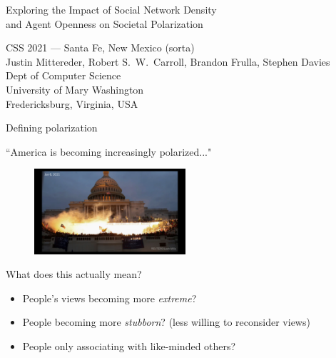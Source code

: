 \documentclass[12pt]{beamer}
\author{Mittereder, \textit{et. al.}}
\begin{document}
\begin{frame}[c]{} %

\begin{center}
\Large
Exploring the Impact of Social Network Density\\and Agent Openness on Societal Polarization

\footnotesize
\vspace{.3in}
CSS 2021 --- Santa Fe, New Mexico (sorta)\\
\vspace{.1in}
Justin Mittereder, Robert S.~W.~Carroll, Brandon Frulla, Stephen Davies\\
\scriptsize
\smallskip
Dept of Computer Science\\
University of Mary Washington\\
Fredericksburg, Virginia, USA\\
\end{center}

\end{frame}

\begin{frame}[c]{Defining polarization} %

\large

\centering
``America is becoming increasingly polarized..."

\vspace{-.2in}
\begin{figure}
\includegraphics[width=0.50\textwidth]{images/capitol.png}
\end{figure}
\pause
\vspace{-.2in}
What does this actually mean?
\vspace{-.15in}
\pause

\small
\begin{itemize}
\itemsep.1em
\item People's views becoming more \textit{extreme}?
\pause
\item People becoming more \textit{stubborn}? (less willing to reconsider views)
\pause
\item People only associating with like-minded others?
\end{itemize}

\end{frame}
\end{document}
